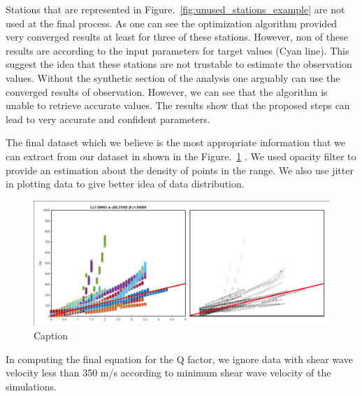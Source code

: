 Stations that are represented in Figure.~\ref{fig:unused_stations_example} are not used at the final process. As one can see the optimization algorithm provided very converged results at least for three of these stations. However, non of these results are according to the input parameters for target values (Cyan line). This suggest the idea that these stations are not trustable to estimate the observation values. Without the synthetic section of the analysis one arguably can use the converged results of observation. However, we can see that the algorithm is unable to retrieve accurate values. The  results show that the proposed steps can lead to very accurate and confident parameters. 

The final dataset which we believe is the most appropriate information that we can extract from our dataset in shown in the Figure.~\ref{fig:results_conservative_with_regression} . We used opacity filter to provide an estimation about the density of points in the range. We also use jitter in plotting data to give better idea of data distribution. 

  \begin{figure}[ht]
    \centering
    \includegraphics[width=\textwidth]{figures/pdf/results_conservative_with_regression.png}
    \caption{Caption }
    \label{fig:results_conservative_with_regression}
\end{figure}

In computing the final equation for the Q factor, we ignore data with shear wave velocity less than 350 m/s according to minimum shear wave velocity of the simulations.  




 

